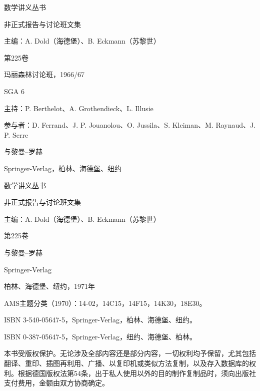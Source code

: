 \begin{center}
{\Large 数学讲义丛书}\par
非正式报告与讨论班文集\par
主编：A. Dold（海德堡）、B. Eckmann（苏黎世）\par
第225卷\par\bigskip
玛丽森林讨论班，1966/67\par
SGA 6\par
主持：P. Berthelot、A. Grothendieck、L. Illusie\par
参与者：D. Ferrand、J. P. Jouanolou、O. Jussila、S. Kleiman、M. Raynaud、J. P. Serre\par\bigskip
{\Large {}与黎曼--罗赫}\par
Springer-Verlag，柏林、海德堡、纽约
\end{center}
\begin{center}
数学讲义丛书\par
非正式报告与讨论班文集\par
主编：A. Dold（海德堡）、B. Eckmann（苏黎世）\par
第225卷\par\bigskip
{}与黎曼--罗赫\par
Springer-Verlag\par
柏林、海德堡、纽约，1971年
\end{center}
AMS主题分类（1970）：14-02，14C15，14F15，14K30，18E30。

ISBN 3-540-05647-5，Springer-Verlag，柏林、海德堡、纽约。\par
ISBN 0-387-05647-5，Springer-Verlag，纽约、海德堡、柏林。

本书受版权保护。无论涉及全部内容还是部分内容，一切权利均予保留，尤其包括翻译、重印、插图再利用、广播、以复印机或类似方法复制，以及存入数据库的权利。根据德国版权法第54条，出于私人使用以外的目的制作复制品时，须向出版社支付费用，金额由双方协商确定。

